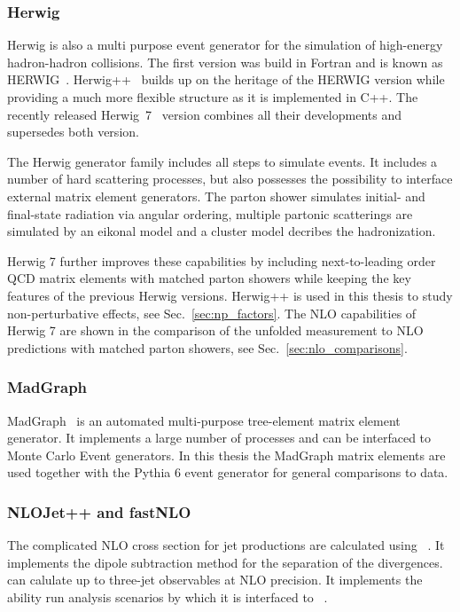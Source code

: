 \subsubsection{Herwig}

Herwig is also a multi purpose event generator for the simulation of high-energy
hadron-hadron collisions. The first version was build in Fortran and is known as
HERWIG~\cite{Corcella:2000bw}. Herwig++~\cite{Bahr:2008pv} builds up on the
heritage of the HERWIG version while providing a much more flexible structure as
it is implemented in C++. The recently released Herwig~7~\cite{Bellm:2015jjp}
version combines all their developments and supersedes both version. 

The Herwig generator family includes all steps to simulate events. It includes a
number of hard scattering processes, but also possesses the possibility to
interface external matrix element generators. The parton shower simulates
initial- and final-state radiation via angular ordering, multiple partonic
scatterings are simulated by an eikonal model and a cluster model decribes the
hadronization. 

Herwig 7 further improves these capabilities by including next-to-leading order
QCD matrix elements with matched parton showers while keeping the key features
of the previous Herwig versions. Herwig++ is used in this thesis to study
non-perturbative effects, see Sec.~\ref{sec:np_factors}. The NLO capabilities of
Herwig 7 are shown in the comparison of the unfolded measurement to NLO
predictions with matched parton showers, see Sec.~\ref{sec:nlo_comparisons}.

\subsubsection{MadGraph}

MadGraph~\cite{Alwall:2011uj} is an automated multi-purpose tree-element matrix
element generator. It implements a large number of processes and can be
interfaced to Monte Carlo Event generators. In this thesis the MadGraph matrix
elements are used together with the Pythia 6 event generator for general
comparisons to data.

\subsubsection{NLOJet++ and fastNLO}
\label{sec:nlojetpp}

The complicated NLO cross section for jet productions are calculated using
\NLOJETPP~\cite{Nagy:2003tz}. It implements the dipole subtraction method for
the separation of the divergences. \NLOJETPP can calulate up to three-jet
observables at NLO precision. It implements the ability run analysis scenarios
by which it is interfaced to \fastNLO~\cite{Kluge:2006xs,Britzger:2012bs}.

